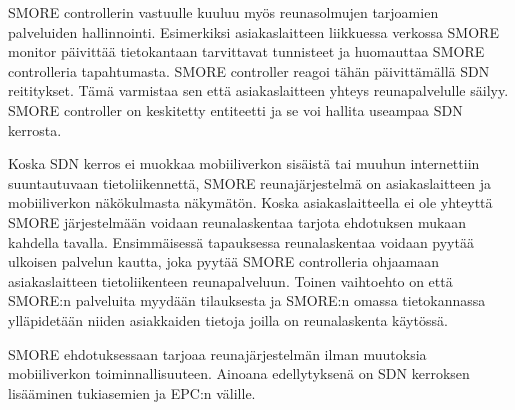 SMORE controllerin vastuulle kuuluu myös reunasolmujen tarjoamien palveluiden hallinnointi. 
Esimerkiksi asiakaslaitteen liikkuessa verkossa SMORE monitor päivittää tietokantaan tarvittavat tunnisteet ja huomauttaa SMORE controlleria tapahtumasta. SMORE controller reagoi tähän päivittämällä SDN reititykset. Tämä varmistaa sen että asiakaslaitteen yhteys reunapalvelulle säilyy. SMORE controller on keskitetty entiteetti ja se voi hallita useampaa SDN kerrosta.

Koska SDN kerros ei muokkaa mobiiliverkon sisäistä tai muuhun  internettiin suuntautuvaan tietoliikennettä, SMORE reunajärjestelmä on asiakaslaitteen ja mobiiliverkon näkökulmasta näkymätön. Koska asiakaslaitteella ei ole yhteyttä SMORE järjestelmään voidaan reunalaskentaa tarjota ehdotuksen mukaan kahdella tavalla. Ensimmäisessä tapauksessa reunalaskentaa voidaan pyytää ulkoisen palvelun kautta, joka pyytää SMORE controlleria ohjaamaan asiakaslaitteen tietoliikenteen reunapalveluun. Toinen vaihtoehto on että SMORE:n palveluita myydään tilauksesta ja SMORE:n omassa tietokannassa ylläpidetään niiden asiakkaiden tietoja joilla on reunalaskenta käytössä. 

SMORE ehdotuksessaan tarjoaa reunajärjestelmän ilman muutoksia mobiiliverkon toiminnallisuuteen. Ainoana edellytyksenä on SDN kerroksen lisääminen tukiasemien ja EPC:n välille. 

